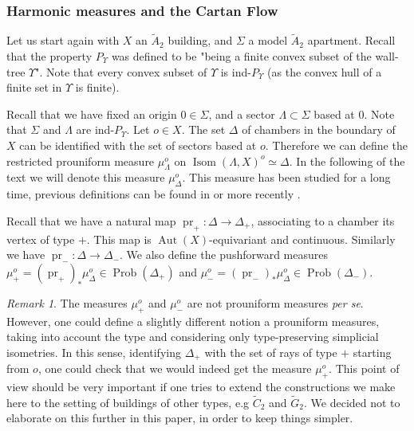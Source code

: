 \documentclass[a4paper, 11pt]{article}
\theoremstyle{plain}
\theoremstyle{definition}
\theoremstyle{remark}
\newtheorem{remark}[proposition]{Remark}
\DeclareMathOperator{\Aut}{Aut}
\DeclareMathOperator{\Isom}{Isom}
\DeclareMathOperator{\pr}{pr}
\DeclareMathOperator{\Prob}{Prob}
\begin{document}
\subsubsection{Harmonic measures and the Cartan Flow}


Let us start again with  $X$  an $\tilde A_2$ building, and $\Sigma$  a model $\tilde A_2$ apartment.  Recall that the property $P_\Upsilon$ was defined to be "being a finite convex subset of the wall-tree $\Upsilon$". Note that every convex subset of $\Upsilon$ is ind-$P_\Upsilon$ (as  the convex hull of a finite set in $\Upsilon$ is finite). %

Recall that we have fixed an origin $0\in \Sigma$, and a sector $\Lambda\subset \Sigma$ based at $0$. Note that $\Sigma$ and $\Lambda$ are ind-$P_\Upsilon$.
Let $o\in X$. The set $\Delta$ of chambers  in the boundary of $X$ can be identified with the set of sectors based at $o$. Therefore we can define the restricted prouniform measure $\mu_\Lambda^o$ on $\Isom(\Lambda,X)^o\simeq \Delta$.  In the following of the text we will denote this measure $\mu_\Delta^o$. This measure has been studied for a long time, previous definitions can be found in  \cite{Parkinson} or more recently \cite[Proposition 6.1]{RemyTrojan}.  

Recall that we have a natural map $\pr_+:\Delta\to\Delta_+$, associating to a chamber its vertex of type $+$. This map is $\Aut(X)$-equivariant and continuous. Similarly we have $\pr_-:\Delta\to \Delta_-$. We also define the pushforward measures $\mu_+^o =(\pr_+)_* \mu_\Delta^o\in \Prob(\Delta_+)$ and $\mu_-^o =(\pr_-)_*\mu_\Delta^o\in \Prob(\Delta_-)$. \index{$\mu_+^o,\mu_-^o$\hfill pushforward of $\mu_\Delta^o$ by $\pr_+$, $\pr_-$|bb}

\begin{remark}
The measures $\mu_+^o$ and $\mu_-^o$ are not prouniform measures \textit{per se}. However, one could define a slightly different notion a prouniform measures, taking into account the type and considering only type-preserving simplicial isometries. In this sense, identifying $\Delta_+$ with the set of rays of type $+$ starting from $o$, one could check that we would indeed get the measure $\mu_+^o$. This point of view should be very important if one tries to extend the constructions we make here to the setting of buildings of other types, e.g $\tilde{C}_2$ and $\tilde{G}_2$. We decided not to elaborate on this further in this paper, in order to keep things simpler.
\end{remark}
\end{document}
